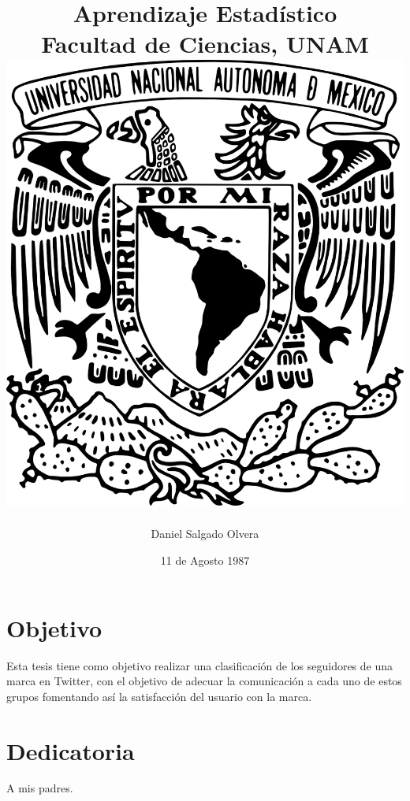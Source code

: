 \documentclass[12pt, twoside]{report}\usepackage[]{graphicx}\usepackage[]{color}
\begin{document}
\title{
  {Aprendizaje Estadístico}\\
  {\large Facultad de Ciencias, UNAM}\\
	{\includegraphics{unam_logo.png}}
}
\author{Daniel Salgado Olvera}
\date{11 de Agosto 1987}
\maketitle

\chapter*{Objetivo}

Esta tesis tiene como objetivo realizar una clasificación de los seguidores de una marca en Twitter, con el objetivo de adecuar la comunicación a cada uno de estos grupos fomentando así la satisfacción del usuario con la marca.

\chapter*{Dedicatoria}
A mis padres.

\tableofcontents
\end{document}
